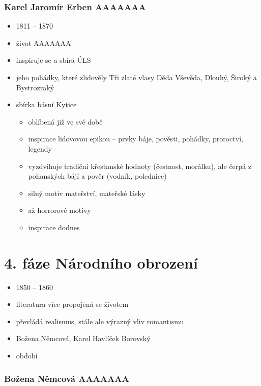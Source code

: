 \documentclass{article}
\begin{document}
\section{Karel Jaromír Erben AAAAAAA}
\begin{itemize}
  \item 1811 -- 1870
  \item život AAAAAAA
  \item inspiruje se a sbírá ÚLS
  \item jeho pohádky, které zlidověly Tři zlaté vlasy Děda Vševěda, Dlouhý, Široký a Bystrozraký
  \item sbírka básní Kytice
  \begin{itemize}
    \item oblíbená již ve své době
    \item inspirace lidovovou epikou -- prvky báje, pověsti, pohádky, proroctví, legendy
    \item vyzdvihuje tradiční křesťanské hodnoty (čestnost, morálku), ale čerpá z pohanských bájí a pověr (vodník, polednice)
    \item silný motiv mateřství, mateřské lásky
    \item až horrorové motivy
    \item inspirace dodnes
  \end{itemize}
\end{itemize}

\part{4. fáze Národního obrození}
\begin{itemize}
  \item 1850 -- 1860
  \item literatura více propojená se životem
  \item převládá realismus, stále ale výrazný vliv romantismu
  \item Božena Němcová, Karel Havlíček Borovský
  \item období 
\end{itemize}

\section{Božena Němcová AAAAAAA}
\end{document}
